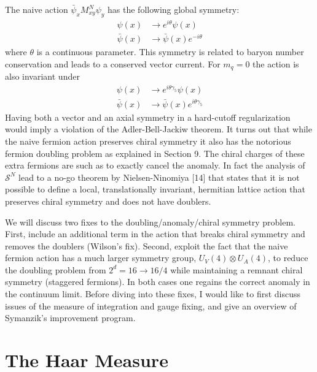 The naive action $\bar\psi_x M_{xy}^N\psi_y$ has the following global
symmetry:
\begin{equation}
\label{eq:vector_psi}
\begin{aligned}
\psi(x) &\to e^{i\theta}\psi(x) \\
\bar\psi(x) &\to \bar\psi(x)e^{-i\theta}
\end{aligned}
\end{equation}
where $\theta$ is a continuous parameter. This symmetry is related to baryon
number conservation and leads to a conserved vector current. For $m_q = 0$
the action is also invariant under
\begin{equation}
\label{eq:axial_psi}
\begin{aligned}
\psi(x) &\to e^{i\theta\gamma_5}\psi(x) \\
\bar\psi(x) &\to \bar\psi(x)e^{i\theta\gamma_5}
\end{aligned}
\end{equation}
Having both a vector and an axial symmetry in a hard-cutoff regularization
would imply a violation of the Adler-Bell-Jackiw theorem. It turns out that
while the naive fermion action preserves chiral symmetry it also has the
notorious fermion doubling problem as explained in Section 9. The chiral
charges of these extra fermions are such as to exactly cancel the anomaly.
In fact the analysis of $\mathcal{S}^N$ lead to a no-go theorem by
Nielsen-Ninomiya [14] that states that it is not possible to define a local,
translationally invariant, hermitian lattice action that preserves chiral
symmetry and does not have doublers.

We will discuss two fixes to the doubling/anomaly/chiral symmetry problem.
First, include an additional term in the action that breaks chiral symmetry
and removes the doublers (Wilson's fix). Second, exploit the fact that the
naive fermion action has a much larger symmetry group, $U_V(4)\otimes U_A(4)$,
to reduce the doubling problem from $2^d = 16 \to 16/4$ while maintaining a
remnant chiral symmetry (staggered fermions). In both cases one regains the
correct anomaly in the continuum limit. Before diving into these fixes, I
would like to first discuss issues of the measure of integration and gauge
fixing, and give an overview of Symanzik's improvement program.

\section{The Haar Measure}

